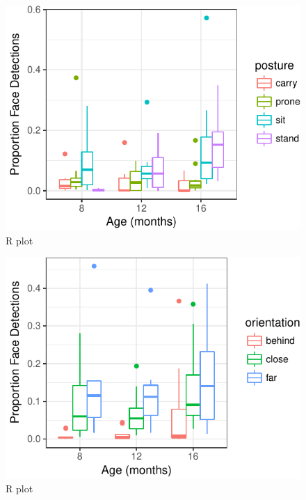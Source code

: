 \documentclass[10pt, letterpaper]{article}
\newenvironment{CodeChunk}{}{}
\begin{document}
\begin{CodeChunk}
\begin{figure}[H]

{\centering \includegraphics{figs/unnamed-chunk-4-1} 

}

\caption[R plot]{R plot}\label{fig:unnamed-chunk-4}
\end{figure}
\end{CodeChunk}

\begin{CodeChunk}
\begin{figure}[H]

{\centering \includegraphics{figs/unnamed-chunk-5-1} 

}

\caption[R plot]{R plot}\label{fig:unnamed-chunk-5}
\end{figure}
\end{CodeChunk}
\end{document}
